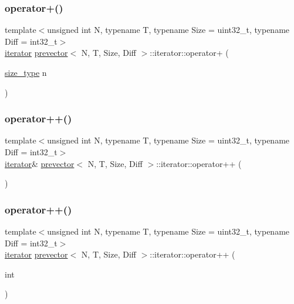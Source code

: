 \subsubsection{\texorpdfstring{operator+()}{operator+()}}
{\footnotesize\ttfamily template$<$unsigned int N, typename T, typename Size = uint32\+\_\+t, typename Diff = int32\+\_\+t$>$ \\
\mbox{\hyperlink{classprevector_1_1iterator}{iterator}} \mbox{\hyperlink{classprevector}{prevector}}$<$ N, T, Size, Diff $>$\+::iterator\+::operator+ (\begin{DoxyParamCaption}\item[{\mbox{\hyperlink{classprevector_a7e0da95e6d1c878f6eeb572f4fc12524}{size\+\_\+type}}}]{n }\end{DoxyParamCaption})\hspace{0.3cm}{\ttfamily [inline]}}

\mbox{\label{classprevector_1_1iterator_a7459dca1c7cead188e6b13700bbfedea}} 
\subsubsection{\texorpdfstring{operator++()}{operator++()}\hspace{0.1cm}{\footnotesize\ttfamily [1/2]}}
{\footnotesize\ttfamily template$<$unsigned int N, typename T, typename Size = uint32\+\_\+t, typename Diff = int32\+\_\+t$>$ \\
\mbox{\hyperlink{classprevector_1_1iterator}{iterator}}\& \mbox{\hyperlink{classprevector}{prevector}}$<$ N, T, Size, Diff $>$\+::iterator\+::operator++ (\begin{DoxyParamCaption}{ }\end{DoxyParamCaption})\hspace{0.3cm}{\ttfamily [inline]}}

\mbox{\label{classprevector_1_1iterator_abb10e5e7efcae2bf8db70acbf0d081cd}} 
\subsubsection{\texorpdfstring{operator++()}{operator++()}\hspace{0.1cm}{\footnotesize\ttfamily [2/2]}}
{\footnotesize\ttfamily template$<$unsigned int N, typename T, typename Size = uint32\+\_\+t, typename Diff = int32\+\_\+t$>$ \\
\mbox{\hyperlink{classprevector_1_1iterator}{iterator}} \mbox{\hyperlink{classprevector}{prevector}}$<$ N, T, Size, Diff $>$\+::iterator\+::operator++ (\begin{DoxyParamCaption}\item[{int}]{ }\end{DoxyParamCaption})\hspace{0.3cm}{\ttfamily [inline]}}

